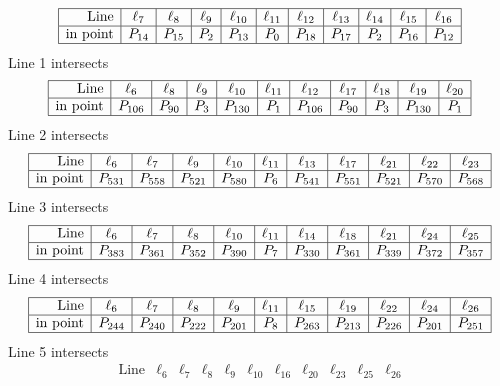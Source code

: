 \documentclass{article}
\begin{document}
{$$\begin{array}{|r*{10}{|c}|}
\hline
\mbox{Line}  & \ell_{7} & \ell_{8} & \ell_{9} & \ell_{10} & \ell_{11} & \ell_{12} & \ell_{13} & \ell_{14} & \ell_{15} & \ell_{16}\\
\hline
\mbox{in point}  & P_{14} & P_{15} & P_{2} & P_{13} & P_{0} & P_{18} & P_{17} & P_{2} & P_{16} & P_{12}\\
\hline
\end{array}
$$
Line 1 intersects 
$$
\begin{array}{|r*{10}{|c}|}
\hline
\mbox{Line}  & \ell_{6} & \ell_{8} & \ell_{9} & \ell_{10} & \ell_{11} & \ell_{12} & \ell_{17} & \ell_{18} & \ell_{19} & \ell_{20}\\
\hline
\mbox{in point}  & P_{106} & P_{90} & P_{3} & P_{130} & P_{1} & P_{106} & P_{90} & P_{3} & P_{130} & P_{1}\\
\hline
\end{array}
$$
Line 2 intersects 
$$
\begin{array}{|r*{10}{|c}|}
\hline
\mbox{Line}  & \ell_{6} & \ell_{7} & \ell_{9} & \ell_{10} & \ell_{11} & \ell_{13} & \ell_{17} & \ell_{21} & \ell_{22} & \ell_{23}\\
\hline
\mbox{in point}  & P_{531} & P_{558} & P_{521} & P_{580} & P_{6} & P_{541} & P_{551} & P_{521} & P_{570} & P_{568}\\
\hline
\end{array}
$$
Line 3 intersects 
$$
\begin{array}{|r*{10}{|c}|}
\hline
\mbox{Line}  & \ell_{6} & \ell_{7} & \ell_{8} & \ell_{10} & \ell_{11} & \ell_{14} & \ell_{18} & \ell_{21} & \ell_{24} & \ell_{25}\\
\hline
\mbox{in point}  & P_{383} & P_{361} & P_{352} & P_{390} & P_{7} & P_{330} & P_{361} & P_{339} & P_{372} & P_{357}\\
\hline
\end{array}
$$
Line 4 intersects 
$$
\begin{array}{|r*{10}{|c}|}
\hline
\mbox{Line}  & \ell_{6} & \ell_{7} & \ell_{8} & \ell_{9} & \ell_{11} & \ell_{15} & \ell_{19} & \ell_{22} & \ell_{24} & \ell_{26}\\
\hline
\mbox{in point}  & P_{244} & P_{240} & P_{222} & P_{201} & P_{8} & P_{263} & P_{213} & P_{226} & P_{201} & P_{251}\\
\hline
\end{array}
$$
Line 5 intersects 
$$
\begin{array}{|r*{10}{|c}|}
\hline
\mbox{Line}  & \ell_{6} & \ell_{7} & \ell_{8} & \ell_{9} & \ell_{10} & \ell_{16} & \ell_{20} & \ell_{23} & \ell_{25} & \ell_{26}\\

\end{array}$$}
\end{document}
